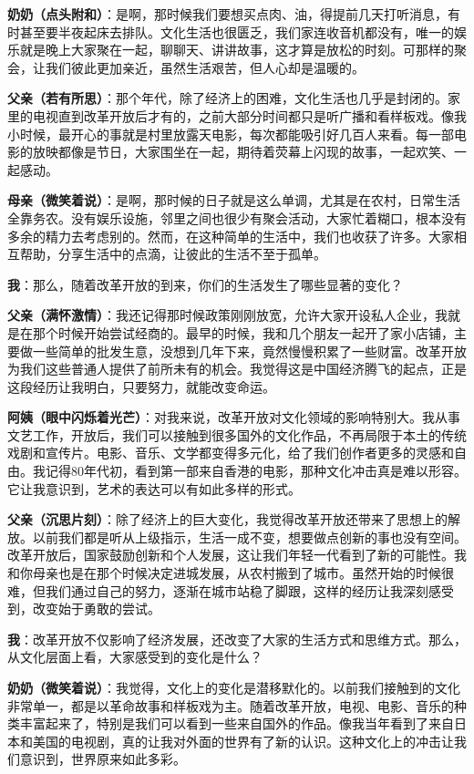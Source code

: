 \documentclass[12pt,a4paper]{article}%
\begin{document}
\textbf{奶奶（点头附和）}：是啊，那时候我们要想买点肉、油，得提前几天打听消息，有时甚至要半夜起床去排队。文化生活也很匮乏，我们家连收音机都没有，唯一的娱乐就是晚上大家聚在一起，聊聊天、讲讲故事，这才算是放松的时刻。可那样的聚会，让我们彼此更加亲近，虽然生活艰苦，但人心却是温暖的。

\textbf{父亲（若有所思）}：那个年代，除了经济上的困难，文化生活也几乎是封闭的。家里的电视直到改革开放后才有的，之前大部分时间都只是听广播和看样板戏。像我小时候，最开心的事就是村里放露天电影，每次都能吸引好几百人来看。每一部电影的放映都像是节日，大家围坐在一起，期待着荧幕上闪现的故事，一起欢笑、一起感动。

\textbf{母亲（微笑着说）}：是啊，那时候的日子就是这么单调，尤其是在农村，日常生活全靠务农。没有娱乐设施，邻里之间也很少有聚会活动，大家忙着糊口，根本没有多余的精力去考虑别的。然而，在这种简单的生活中，我们也收获了许多。大家相互帮助，分享生活中的点滴，让彼此的生活不至于孤单。

\textbf{我}：那么，随着改革开放的到来，你们的生活发生了哪些显著的变化？

\textbf{父亲（满怀激情）}：我还记得那时候政策刚刚放宽，允许大家开设私人企业，我就是在那个时候开始尝试经商的。最早的时候，我和几个朋友一起开了家小店铺，主要做一些简单的批发生意，没想到几年下来，竟然慢慢积累了一些财富。改革开放为我们这些普通人提供了前所未有的机会。我觉得这是中国经济腾飞的起点，正是这段经历让我明白，只要努力，就能改变命运。

\textbf{阿姨（眼中闪烁着光芒）}：对我来说，改革开放对文化领域的影响特别大。我从事文艺工作，开放后，我们可以接触到很多国外的文化作品，不再局限于本土的传统戏剧和宣传片。电影、音乐、文学都变得多元化，给了我们创作者更多的灵感和自由。我记得80年代初，看到第一部来自香港的电影，那种文化冲击真是难以形容。它让我意识到，艺术的表达可以有如此多样的形式。

\textbf{父亲（沉思片刻）}：除了经济上的巨大变化，我觉得改革开放还带来了思想上的解放。以前我们都是听从上级指示，生活一成不变，想要做点创新的事也没有空间。改革开放后，国家鼓励创新和个人发展，这让我们年轻一代看到了新的可能性。我和你母亲也是在那个时候决定进城发展，从农村搬到了城市。虽然开始的时候很难，但我们通过自己的努力，逐渐在城市站稳了脚跟，这样的经历让我深刻感受到，改变始于勇敢的尝试。

\textbf{我}：改革开放不仅影响了经济发展，还改变了大家的生活方式和思维方式。那么，从文化层面上看，大家感受到的变化是什么？

\textbf{奶奶（微笑着说）}：我觉得，文化上的变化是潜移默化的。以前我们接触到的文化非常单一，都是以革命故事和样板戏为主。随着改革开放，电视、电影、音乐的种类丰富起来了，特别是我们可以看到一些来自国外的作品。像我当年看到了来自日本和美国的电视剧，真的让我对外面的世界有了新的认识。这种文化上的冲击让我们意识到，世界原来如此多彩。
\end{document}
